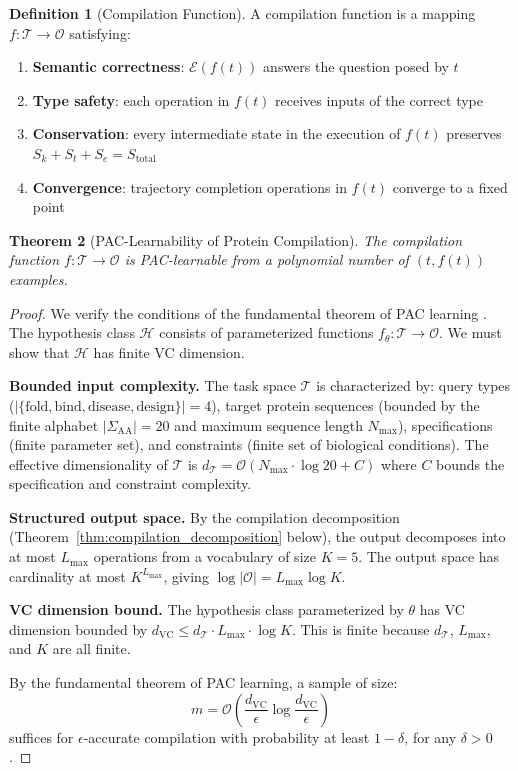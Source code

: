 \documentclass[11pt,twocolumn,a4paper]{article}
\newtheorem{theorem}{Theorem}[section]
\theoremstyle{definition}
\newtheorem{definition}[theorem]{Definition}
\theoremstyle{remark}
\newcommand{\Sk}{S_k}
\newcommand{\St}{S_t}
\newcommand{\Se}{S_e}
\newcommand{\params}{\theta}
\newcommand{\taskspace}{\mathcal{T}}
\newcommand{\opspace}{\mathcal{O}}
\newcommand{\engine}{\mathcal{E}}
\begin{document}
\begin{definition}[Compilation Function]
\label{def:compilation}
A compilation function is a mapping $f: \taskspace \to \opspace$ satisfying:
\begin{enumerate}
    \item \textbf{Semantic correctness}: $\engine(f(t))$ answers the question posed by $t$
    \item \textbf{Type safety}: each operation in $f(t)$ receives inputs of the correct type
    \item \textbf{Conservation}: every intermediate state in the execution of $f(t)$ preserves $\Sk + \St + \Se = S_{\mathrm{total}}$
    \item \textbf{Convergence}: trajectory completion operations in $f(t)$ converge to a fixed point
\end{enumerate}
\end{definition}

\begin{theorem}[PAC-Learnability of Protein Compilation]
\label{thm:pac_learnable}
The compilation function $f: \taskspace \to \opspace$ is PAC-learnable from a polynomial number of $(t, f(t))$ examples.
\end{theorem}

\begin{proof}
We verify the conditions of the fundamental theorem of PAC learning \citep{valiant1984}. The hypothesis class $\mathcal{H}$ consists of parameterized functions $f_\params: \taskspace \to \opspace$. We must show that $\mathcal{H}$ has finite VC dimension.

\textbf{Bounded input complexity.} The task space $\taskspace$ is characterized by: query types ($|\{\text{fold}, \text{bind}, \text{disease}, \text{design}\}| = 4$), target protein sequences (bounded by the finite alphabet $|\Sigma_{\text{AA}}| = 20$ and maximum sequence length $N_{\max}$), specifications (finite parameter set), and constraints (finite set of biological conditions). The effective dimensionality of $\taskspace$ is $d_{\taskspace} = \mathcal{O}(N_{\max} \cdot \log 20 + C)$ where $C$ bounds the specification and constraint complexity.

\textbf{Structured output space.} By the compilation decomposition (Theorem~\ref{thm:compilation_decomposition} below), the output decomposes into at most $L_{\max}$ operations from a vocabulary of size $K = 5$. The output space has cardinality at most $K^{L_{\max}}$, giving $\log |\opspace| = L_{\max} \log K$.

\textbf{VC dimension bound.} The hypothesis class parameterized by $\params$ has VC dimension bounded by $d_{\text{VC}} \leq d_\taskspace \cdot L_{\max} \cdot \log K$. This is finite because $d_\taskspace$, $L_{\max}$, and $K$ are all finite.

By the fundamental theorem of PAC learning, a sample of size:
\begin{equation}
m = \mathcal{O}\left(\frac{d_{\text{VC}}}{\epsilon} \log \frac{d_{\text{VC}}}{\epsilon}\right)
\end{equation}
suffices for $\epsilon$-accurate compilation with probability at least $1 - \delta$, for any $\delta > 0$.
\end{proof}
\end{document}
